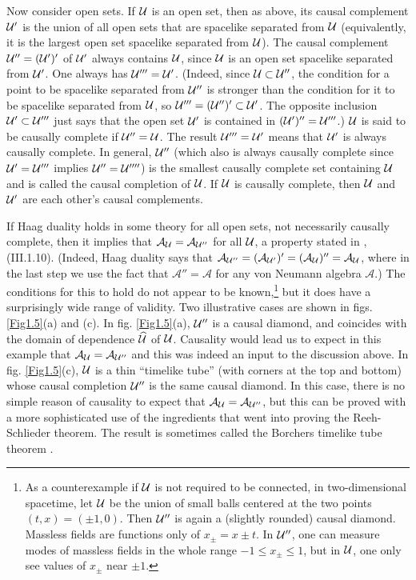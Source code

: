 \documentclass[12pt]{article}
\def\hat{\widehat}
\numberwithin{equation}{section}
\def\A{{\mathcal A}}
\begin{document}
Now consider open sets.  If ${\mathcal U}$ is an open set, then as above, its causal complement ${\mathcal U}'$ is the union of all open sets that
are spacelike separated from ${\mathcal U}$ (equivalently, it is the largest open set spacelike separated from ${\mathcal U}$).
The causal complement   ${\mathcal U}''=({\mathcal U}')'$ of ${\mathcal U}'$ always contains ${\mathcal U}$, since ${\mathcal U}$ is an open set spacelike separated from ${\mathcal U}'$.  
 One always has ${\mathcal U}'''={\mathcal U}'$.   (Indeed, since ${\mathcal U}\subset {\mathcal U}''$,
the condition for a point to be spacelike separated from ${\mathcal U}''$ is stronger than the condition for it to be spacelike separated from
${\mathcal U}$, so ${\mathcal U}'''= ({\mathcal U}'')'\subset {\mathcal U}'$.  The opposite inclusion ${\mathcal U}'\subset {\mathcal U}'''$ just says that the open set ${\mathcal U}'$ is contained in $({\mathcal U}')''={\mathcal U}'''$.)   ${\mathcal U}$ is said to be causally complete if ${\mathcal U}''={\mathcal U}$.   The result ${\mathcal U}'''={\mathcal U}'$ means that ${\mathcal U}'$
is always causally complete.     In general, ${\mathcal U}''$ (which also is always causally complete since ${\mathcal U}'={\mathcal U}'''$ implies ${\mathcal U}''={\mathcal U}''''$) is the smallest
causally complete set containing ${\mathcal U}$ and is called 
the causal completion of ${\mathcal U}$.  If ${\mathcal U}$ is causally complete, then
 ${\mathcal U}$ and ${\mathcal U}'$ are each
other's causal complements.


If Haag duality holds in some theory 
for all open sets, not necessarily causally complete, then it implies that $\A_\U =\A_{\U''}$ for all ${\mathcal U}$,
a property stated in  \cite{Haag}, (III.1.10).   (Indeed, Haag duality says that $\A_{\U''}=(\A_{\U'})'=(\A_\U)''=\A_\U$, where in the
last step we use the fact that $\A''=\A$ for any von Neumann algebra $\A$.)  The conditions for this to hold
 do not appear to be known,\footnote{As a counterexample if ${\mathcal U}$  is not required to be connected,
in two-dimensional spacetime, let ${\mathcal U}$ be the union of small balls centered at the two points $(t,x)=(\pm 1,0)$.   Then ${\mathcal U}''$
is again a (slightly rounded) causal diamond.  Massless fields are functions only of $x_\pm = x\pm t$.  In ${\mathcal U}''$, one can measure
modes of massless fields in the whole range $-1\leq x_\pm \leq 1$, but in ${\mathcal U}$, one only see values of $x_\pm$ near $\pm 1$.}
    but it does have a surprisingly wide range of validity.  Two illustrative cases are
shown in figs. \ref{Fig1.5}(a) and (c).  In fig. \ref{Fig1.5}(a), ${\mathcal U}''$ is a causal diamond, and coincides with the domain of dependence
$\hat \U$  of ${\mathcal U}$.    Causality would lead
us to expect in this example
 that $\A_\U=\A_{\U''}$ and this was indeed an input to the discussion above.  In fig. \ref{Fig1.5}(c), ${\mathcal U}$
is a thin ``timelike tube'' (with corners at the top and bottom) whose causal completion  ${\mathcal U}''$ is the same causal diamond.     In this case, there is no simple
reason of causality  to expect that $\A_\U=\A_{\U''}$, but this can be proved with a more sophisticated use of the 
ingredients that went into proving the Reeh-Schlieder theorem.  The result is sometimes called the Borchers timelike tube theorem \cite{OtherBorchers, OtherAraki, Wightman,BorchersBook}.
\end{document}
